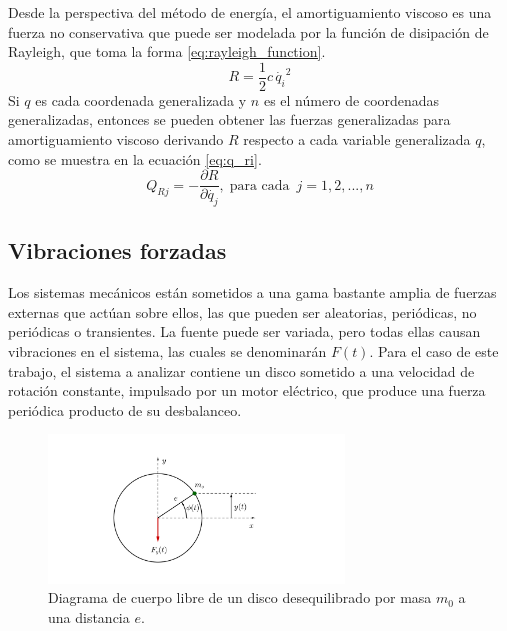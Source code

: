 Desde la perspectiva del método de energía, el amortiguamiento viscoso es una fuerza no conservativa que puede ser modelada por la función de disipación de Rayleigh, que toma la forma \ref{eq:rayleigh_function}.
\begin{equation}\label{eq:rayleigh_function}
	R = \frac{1}{2}c\,\dot{q_i}^2
\end{equation} 
Si $q$ es cada coordenada generalizada y $n$ es el número de coordenadas generalizadas, entonces se pueden obtener las fuerzas generalizadas para amortiguamiento viscoso derivando $R$ respecto a cada variable generalizada $q$, como se muestra en la ecuación \ref{eq:q_ri}.
\begin{equation}\label{eq:q_ri}
	Q_{Rj} = -\frac{\partial R}{\partial \dot{q_j}}, \; \text{para cada }\, j=1,2,...,n
\end{equation}

\subsection{Vibraciones forzadas}
\label{sec:vib_forzadas}
Los sistemas mecánicos están sometidos a una gama bastante amplia de fuerzas externas que actúan sobre ellos, las que pueden ser aleatorias, periódicas, no periódicas o transientes. La fuente puede ser variada, pero todas ellas causan vibraciones en el sistema, las cuales se denominarán $F(t)$. Para el caso de este trabajo, el sistema a analizar contiene un disco sometido a una velocidad de rotación constante, impulsado por un motor eléctrico, que produce una fuerza periódica producto de su desbalanceo.

\begin{figure}[h]
\centering
\includegraphics[width=0.7\textwidth, trim={6cm 2cm 10cm 3cm}, clip]{Imagenes/dcl_maqdes.pdf}
\caption{Diagrama de cuerpo libre de un disco desequilibrado por masa $m_0$ a una distancia $e$.}
\label{fig:dcl_maqdes}
\end{figure}

